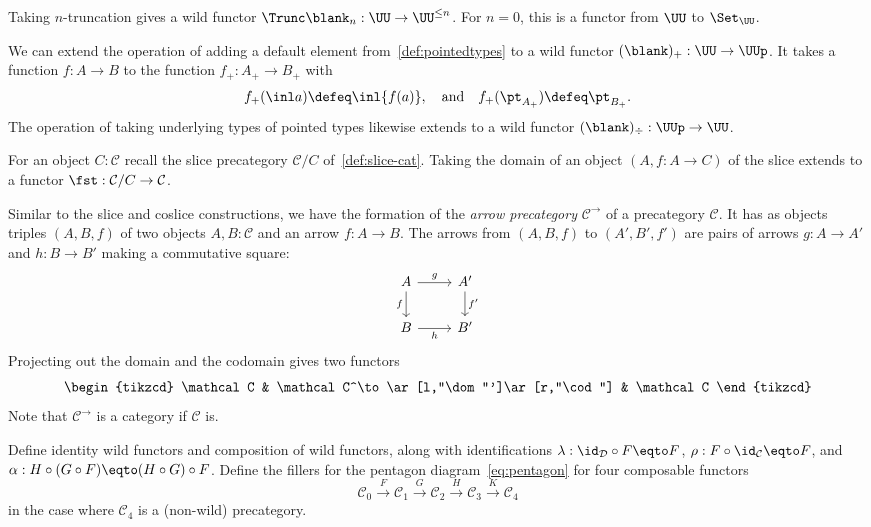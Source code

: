 \begin{example}
  Taking $n$-truncation gives a wild functor
  $\Trunc\blank_n : \UU \to \UU^{\le n}$.
  For $n=0$, this is a functor from $\UU$ to $\Set_\UU$.
\end{example}
\begin{example}\label{ex:add-remove-basepoint}
  We can extend the operation of adding a default element
  from~\cref{def:pointedtypes}
  to a wild functor $(\blank)_+ : \UU \to \UUp$.
  It takes a function $f : A \to B$
  to the function $f_+ : A_+ \to B_+$
  with
  \[
    f_+(\inl a) \defeq \inl{f(a)},\quad\text{and}\quad
    f_+(\pt_{A_+}) \defeq \pt_{B_+}.
  \]
  The operation of taking underlying types of pointed types
  likewise extends to a wild functor $(\blank)_\div : \UUp \to \UU$.
\end{example}
\begin{example}
  For an object $C : \mathcal C$ recall the slice precategory
  $\mathcal C/C$ of~\cref{def:slice-cat}.
  Taking the domain of an object $(A,f:A\to C)$ of the slice
  extends to a functor $\fst : \mathcal C/C \to \mathcal C$.
\end{example}
\begin{example}
  Similar to the slice and coslice constructions,
  we have the formation of the \emph{arrow precategory} $\mathcal C^\to$
  of a precategory $\mathcal C$.
  It has as objects triples $(A,B,f)$ of two objects $A,B:\mathcal C$
  and an arrow $f: A\to B$.
  The arrows from $(A,B,f)$ to $(A',B',f')$ are pairs of arrows
  $g : A \to A'$ and $h : B\to B'$ making a commutative square:
  \[
    \begin{tikzcd}
      A \ar[d,"f"']\ar[r,"g"] & A'\ar[d,"f'"] \\
      B \ar[r,"h"'] & B'
    \end{tikzcd}
  \]
  Projecting out the domain and the codomain gives
  two functors
  \[
    \begin{tikzcd}
      \mathcal C & \mathcal C^\to \ar[l,"\dom"']\ar[r,"\cod"] & \mathcal C
    \end{tikzcd}
  \]
  Note that $\mathcal C^\to$ is a category if $\mathcal C$ is.
\end{example}
\begin{xca}
  Define identity wild functors and composition of wild functors,
  along with identifications $\lambda : \id_{\mathcal D}\circ F \eqto F$,
  $\rho : F \circ \id_{\mathcal C} \eqto F$,
  and $\alpha : H\circ (G \circ F) \eqto (H \circ G)\circ F$.
  Define the fillers for the pentagon diagram~\eqref{eq:pentagon}
  for four composable functors
  \[
    \mathcal C_0 \xrightarrow F
    \mathcal C_1 \xrightarrow G
    \mathcal C_2 \xrightarrow H
    \mathcal C_3 \xrightarrow K
    \mathcal C_4
  \]
  in the case where $\mathcal C_4$ is a (non-wild) precategory.
\end{xca}
